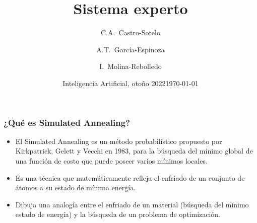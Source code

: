 \documentclass[aspectratio=169]{beamer}
\title{Sistema experto}
\author[Castro-Sotelo, García-Espinoza, Molina-Rebolledo] %
{C.A.~Castro-Sotelo \and A.T.~García-Espinoza \and I.~Molina-Rebolledo}
\institute[BUAP] %
{
  Facultad de Ciencias de la Computación\\
  Benemérita Universidad Autónoma de Puebla
}
\date[Otoño 2022] %
{Inteligencia Artificial, otoño 2022}
\date{\today}
\begin{document}
\frame{\titlepage}


\begin{frame}
\frametitle{¿Qué es Simulated Annealing?}

\begin{itemize}[<+->]
\item El Simulated Annealing es un método probabilístico propuesto por Kirkpatrick, 
Gelett y Vecchi en 1983, para la búsqueda del mínimo global de una función de
costo que puede poseer varios mínimos locales.

\item Es una técnica que matemáticamente refleja el enfriado de un conjunto de átomos
a su estado de mínima energía.

\item Dibuja una analogía entre el enfriado de un material (búsqueda del mínimo estado
de energía) y la búsqueda de un problema de optimización.
\end{itemize}

\end{frame}
\end{document}

